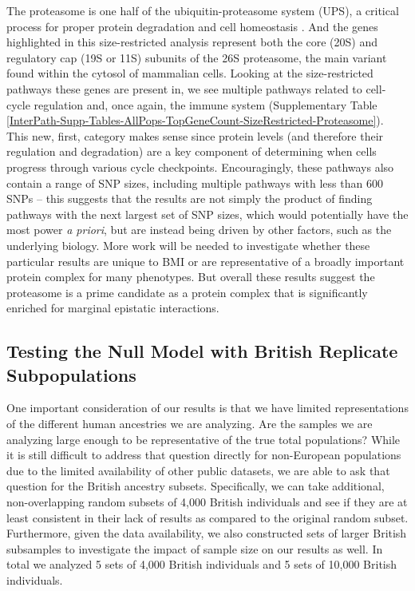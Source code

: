 \documentclass[12pt,a4paper]{article}
\begin{document}
The proteasome is one half of the ubiquitin-proteasome system (UPS), a critical process for proper protein degradation and cell homeostasis \citep{Voges1999,Livneh2016,Collins2017}. And the genes highlighted in this size-restricted analysis represent both the core (20S) and regulatory cap (19S or 11S) subunits of the 26S proteasome, the main variant found within the cytosol of mammalian cells. Looking at the size-restricted pathways these genes are present in, we see multiple pathways related to cell-cycle regulation and, once again, the immune system (Supplementary Table \ref{InterPath-Supp-Tables-AllPops-TopGeneCount-SizeRestricted-Proteasome}). This new, first, category makes sense since protein levels (and therefore their regulation and degradation) are a key component of determining when cells progress through various cycle checkpoints. Encouragingly, these pathways also contain a range of SNP sizes, including multiple pathways with less than 600 SNPs -- this suggests that the results are not simply the product of finding pathways with the next largest set of SNP sizes, which would potentially have the most power \textit{a priori}, but are instead being driven by other factors, such as the underlying biology. More work will be needed to investigate whether these particular results are unique to BMI or are representative of a broadly important protein complex for many phenotypes. But overall these results suggest the proteasome is a prime candidate as a protein complex that is significantly enriched for marginal epistatic interactions.  


\subsection{Testing the Null Model with British Replicate Subpopulations}

One important consideration of our results is that we have limited representations of the different human ancestries we are analyzing. Are the samples we are analyzing large enough to be representative of the true total populations? While it is still difficult to address that question directly for non-European populations due to the limited availability of other public datasets, we are able to ask that question for the British ancestry subsets. Specifically, we can take additional, non-overlapping random subsets of 4,000 British individuals and see if they are at least consistent in their lack of results as compared to the original random subset. Furthermore, given the data availability, we also constructed sets of larger British subsamples to investigate the impact of sample size on our results as well. In total we analyzed 5 sets of 4,000 British individuals and 5 sets of 10,000 British individuals. 
\end{document}
